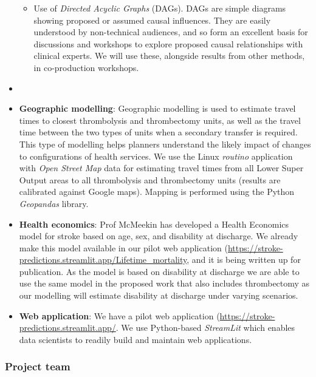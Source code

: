 \begin{itemize}
\begin{itemize}
        \item Use of \textit{Directed Acyclic Graphs} (DAGs). DAGs are simple diagrams showing proposed or assumed causal influences. They are easily understood by non-technical audiences, and so form an excellent basis for discussions and workshops to explore proposed causal relationships with clinical experts. We will use these, alongside results from other methods, in co-production workshops.
    \end{itemize}

    \item 

    \item \textbf{Geographic modelling}: Geographic modelling is used to estimate travel times to closest thrombolysis and thrombectomy units, as well as the travel time between the two types of units when a secondary transfer is required. This type of modelling helps planners understand the likely impact of changes to configurations of health services. We use the Linux \textit{routino} application with \textit{Open Street Map} data for estimating travel times from all Lower Super Output areas to all thrombolysis and thrombectomy units (results are calibrated against Google maps). Mapping is performed using the Python \textit{Geopandas} library.

    \item \textbf{Health economics}: Prof McMeekin has developed a Health Economics model for stroke based on age, sex, and disability at discharge. We already make this model available in our pilot web application (\url{https://stroke-predictions.streamlit.app/Lifetime_mortality}, and it is being written up for publication. As the model is based on disability at discharge we are able to use the same model in the proposed work that also includes thrombectomy as our modelling will estimate disability at discharge under varying scenarios.

    \item \textbf{Web application}: We have a pilot web application (\url{https://stroke-predictions.streamlit.app/}. We use Python-based \textit{StreamLit} which enables data scientists to readily build and maintain web applications.
    
\end{itemize}


\subsubsection{Project team}

